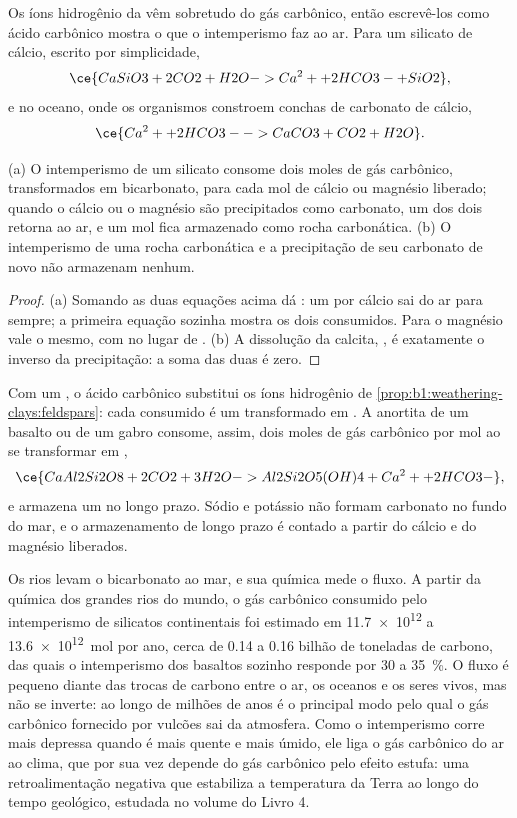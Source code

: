 Os íons hidrogênio da  vêm sobretudo do gás carbônico, então escrevê-los como ácido carbônico mostra o que o intemperismo faz ao ar. Para um silicato de cálcio, escrito  por simplicidade,
\[
  \ce{CaSiO3 + 2 CO2 + H2O -> Ca^2+ + 2 HCO3- + SiO2},
\]
e no oceano, onde os organismos constroem conchas de carbonato de cálcio,
\[
  \ce{Ca^2+ + 2 HCO3- -> CaCO3 + CO2 + H2O}.
\]

\begin{proposition}\label{prop:b1:weathering-clays:co2}
(a) O intemperismo de um silicato consome dois moles de gás carbônico, transformados em bicarbonato, para cada mol de cálcio ou magnésio liberado; quando o cálcio ou o magnésio são precipitados como carbonato, um dos dois retorna ao ar, e um mol fica armazenado como rocha carbonática. (b) O intemperismo de uma rocha carbonática e a precipitação de seu carbonato de novo não armazenam nenhum.
\end{proposition}

\begin{proof}
(a) Somando as duas equações acima dá : um  por cálcio sai do ar para sempre; a primeira equação sozinha mostra os dois consumidos. Para o magnésio vale o mesmo, com  no lugar de
. (b) A dissolução da calcita, , é exatamente o inverso da precipitação: a soma das duas é zero.
\end{proof}

Com um , o ácido carbônico substitui os íons hidrogênio de \cref{prop:b1:weathering-clays:feldspars}: cada  consumido é um  transformado em . A anortita de um basalto ou de um gabro consome, assim, dois moles de gás carbônico por mol ao se transformar em ,
\[
  \ce{CaAl2Si2O8 + 2 CO2 + 3 H2O -> Al2Si2O5(OH)4 + Ca^2+ + 2 HCO3-},
\]
e armazena um no longo prazo. Sódio e potássio não formam carbonato no fundo do mar, e o armazenamento de longo prazo é contado a partir do cálcio e do magnésio liberados.

Os rios levam o bicarbonato ao mar, e sua química mede o fluxo. A partir da química dos grandes rios do mundo, o gás carbônico consumido pelo intemperismo de silicatos continentais foi estimado em \num{11.7e12} a \qty{13.6e12}{mol} por ano, cerca de 0.14 a 0.16 bilhão de toneladas de carbono, das quais o intemperismo dos basaltos sozinho responde por 30 a \qty{35}{\percent}. O fluxo é pequeno diante das trocas de carbono entre o ar, os oceanos e os seres vivos, mas não se inverte: ao longo de milhões de anos é o principal modo pelo qual o gás carbônico fornecido por vulcões sai da atmosfera. Como o intemperismo corre mais depressa quando é mais quente e mais úmido, ele liga o gás carbônico do ar ao clima, que por sua vez depende do gás carbônico pelo efeito estufa: uma retroalimentação negativa que estabiliza a temperatura da Terra ao longo do tempo geológico, estudada no volume do Livro 4.

